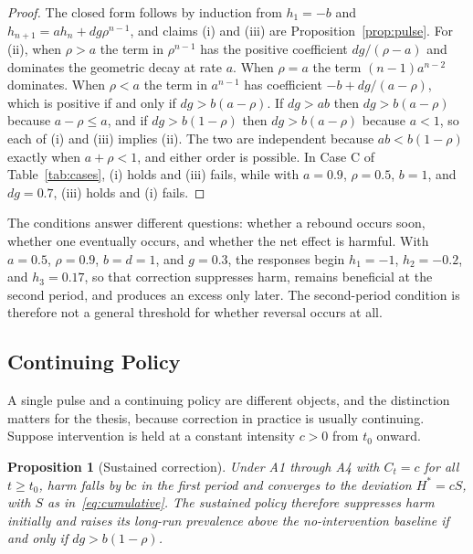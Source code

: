 \documentclass[12pt]{article}
\newtheorem{proposition}{Proposition}
\theoremstyle{remark}
\begin{document}
\begin{proof}
The closed form follows by induction from $h_1 = -b$ and $h_{n+1} = a h_n + dg\rho^{n-1}$, and claims (i) and (iii) are Proposition~\ref{prop:pulse}. For (ii), when $\rho > a$ the term in $\rho^{n-1}$ has the positive coefficient $dg/(\rho-a)$ and dominates the geometric decay at rate $a$. When $\rho = a$ the term $(n-1)a^{n-2}$ dominates. When $\rho < a$ the term in $a^{n-1}$ has coefficient $-b + dg/(a-\rho)$, which is positive if and only if $dg > b(a-\rho)$. If $dg > ab$ then $dg > b(a-\rho)$ because $a - \rho \le a$, and if $dg > b(1-\rho)$ then $dg > b(a-\rho)$ because $a < 1$, so each of (i) and (iii) implies (ii). The two are independent because $ab < b(1-\rho)$ exactly when $a + \rho < 1$, and either order is possible. In Case C of Table~\ref{tab:cases}, (i) holds and (iii) fails, while with $a = 0.9$, $\rho = 0.5$, $b = 1$, and $dg = 0.7$, (iii) holds and (i) fails.
\end{proof}

The conditions answer different questions: whether a rebound occurs soon, whether one eventually occurs, and whether the net effect is harmful. With $a = 0.5$, $\rho = 0.9$, $b = d = 1$, and $g = 0.3$, the responses begin $h_1 = -1$, $h_2 = -0.2$, and $h_3 = 0.17$, so that correction suppresses harm, remains beneficial at the second period, and produces an excess only later. The second-period condition is therefore not a general threshold for whether reversal occurs at all.

\subsection{Continuing Policy}

A single pulse and a continuing policy are different objects, and the distinction matters for the thesis, because correction in practice is usually continuing. Suppose intervention is held at a constant intensity $c > 0$ from $t_0$ onward.

\begin{proposition}[Sustained correction]
\label{prop:sustained}
Under A1 through A4 with $C_t = c$ for all $t \ge t_0$, harm falls by $bc$ in the first period and converges to the deviation $H^{*} = cS$, with $S$ as in~\eqref{eq:cumulative}. The sustained policy therefore suppresses harm initially and raises its long-run prevalence above the no-intervention baseline if and only if $dg > b(1-\rho)$.
\end{proposition}
\end{document}
